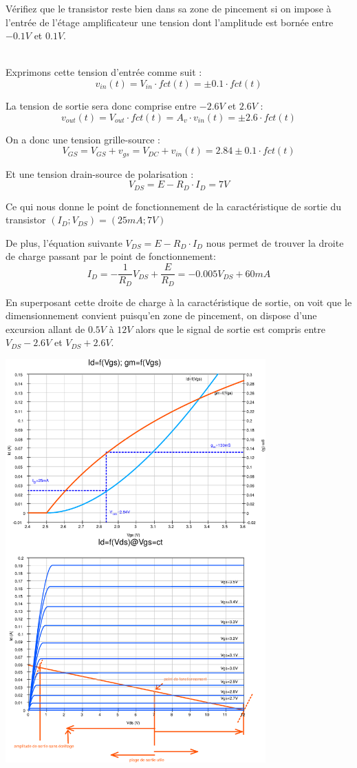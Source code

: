\Question
{%
Vérifiez que le transistor reste bien dans sa zone de pincement si on impose à l'entrée de l'étage amplificateur une tension dont l'amplitude est bornée entre $-0.1V$ et $0.1V$.

}
{
~\\
Exprimons cette tension d'entrée comme suit :
$$v_{in}(t)=V_{in}\cdot fct(t)=\pm 0.1\cdot fct(t)$$

La tension de sortie sera donc comprise entre $-2.6V$ et $2.6V$ :
$$v_{out}(t)=V_{out}\cdot fct(t)=A_v\cdot v_{in}(t)= \pm 2.6\cdot fct(t)$$


On a donc une tension grille-source :
$$V_{GS}=V_{GS} + v_{gs}=V_{DC} + v_{in}(t)=2.84\pm 0.1\cdot fct(t)$$

Et une tension drain-source de polarisation :
$$V_{DS}=E-R_D\cdot I_{D}=7V$$

Ce qui nous donne le point de fonctionnement de la caractéristique de sortie du transistor $(I_{D};V_{DS})=(25mA;7V)$

De plus, l'équation suivante $V_{DS}=E-R_D\cdot I_{D}$ nous permet de trouver la droite de charge  passant par le point de fonctionnement:\\
$$I_D=-\frac{1}{R_D}V_{DS}+\frac{E}{R_D}=-0.005V_{DS}+60mA$$

En superposant cette droite de charge à la caractéristique de sortie, on voit que le dimensionnement convient puisqu'en zone de pincement, on dispose d'une excursion allant de $0.5V$ à $12V$ alors que le signal de sortie est compris entre $V_{DS}-2.6V$ et $V_{DS}+2.6V$.
\begin{center}
	\includegraphics[width=10cm]{mos_exam_corr-crop.pdf}
\end{center}
}
